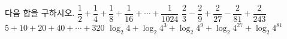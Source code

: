 다음 합을 구하시오.
 $\dfrac{1}{2}+\dfrac{1}{4}+\dfrac{1}{8}+\dfrac{1}{16}+\cdots+\dfrac{1}{1024}$
 $\dfrac{2}{3}-\dfrac{2}{9}+\dfrac{2}{27}-\dfrac{2}{81}+\dfrac{2}{243}$
 $5+10+20+40+\cdots+320$
 $\log_2 4+\log_2 4^3+\log_2 4^9+\log_2 4^{27}+\log_2 4^{81}$
